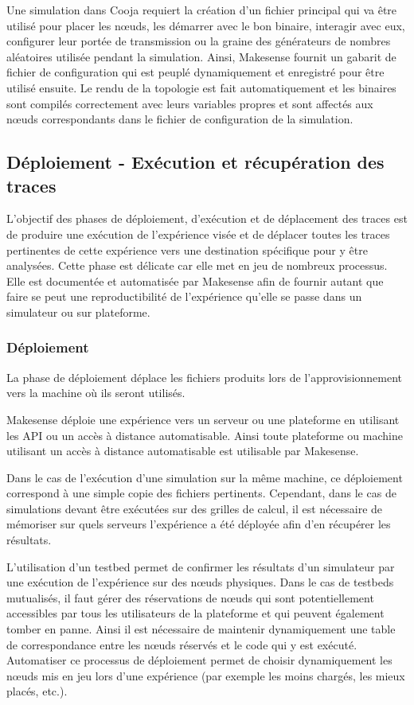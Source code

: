Une simulation dans Cooja requiert la création d'un fichier principal qui va être utilisé pour placer les nœuds, les démarrer avec le bon binaire, interagir avec eux, configurer leur portée de transmission ou la graine des générateurs de nombres aléatoires utilisée pendant la simulation.
Ainsi, Makesense fournit un gabarit de fichier de configuration qui est peuplé dynamiquement et enregistré pour être utilisé ensuite.
Le rendu de la topologie est fait automatiquement et les binaires sont compilés correctement avec leurs variables propres et sont affectés aux nœuds correspondants dans le fichier de configuration de la simulation.

\subsection{Déploiement - Exécution et récupération des traces}
\label{automation:deploy_execute_move}

L'objectif des phases de déploiement, d'exécution et de déplacement des traces est de produire une exécution de l'expérience visée et de déplacer toutes les traces pertinentes de cette expérience vers une destination spécifique pour y être analysées.
Cette phase est délicate car elle met en jeu de nombreux processus.
Elle est documentée et automatisée par Makesense afin de fournir autant que faire se peut une reproductibilité de l'expérience qu'elle se passe dans un simulateur ou sur plateforme.

\subsubsection{Déploiement}

La phase de déploiement déplace les fichiers produits lors de l'approvisionnement vers la machine où ils seront utilisés.

Makesense déploie une expérience vers un serveur ou une plateforme en utilisant les \ac{API} ou un accès à distance automatisable.
Ainsi toute plateforme ou machine utilisant un accès à distance automatisable est utilisable par Makesense.

Dans le cas de l'exécution d'une simulation sur la même machine, ce déploiement correspond à une simple copie des fichiers pertinents.
Cependant, dans le cas de simulations devant être exécutées sur des grilles de calcul, il est nécessaire de mémoriser sur quels serveurs l'expérience a été déployée afin d'en récupérer les résultats.

L'utilisation d'un testbed permet de confirmer les résultats d'un simulateur par une exécution de l'expérience sur des nœuds physiques.
Dans le cas de testbeds mutualisés, il faut gérer des réservations de nœuds qui sont potentiellement accessibles par tous les utilisateurs de la plateforme et qui peuvent également tomber en panne.
Ainsi il est nécessaire de maintenir dynamiquement une table de correspondance entre les  nœuds réservés et le code qui y est exécuté.
Automatiser ce processus de déploiement permet de choisir dynamiquement les nœuds mis en jeu lors d'une expérience (par exemple les moins chargés, les mieux placés, etc.).

